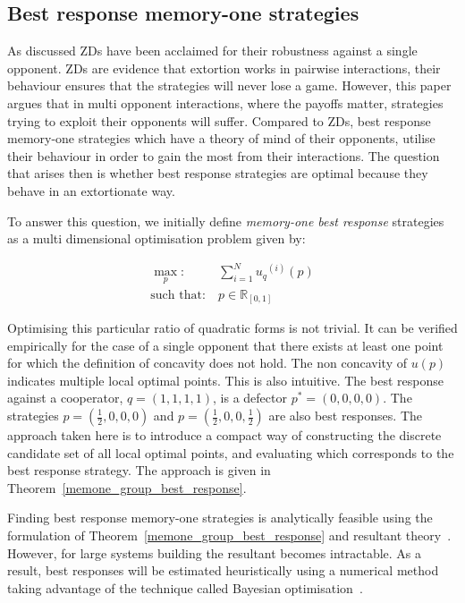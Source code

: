 \documentclass[9pt,twocolumn,twoside,lineno]{pnas-new}
\newcommand{\R}{\mathbb{R}}
\begin{document}
\subsection*{Best response memory-one strategies}

As discussed ZDs have been acclaimed for their robustness
against a single opponent. ZDs are evidence that extortion works
in pairwise interactions, their behaviour ensures that the strategies will never
lose a game. However, this paper argues that in multi opponent interactions,
where the payoffs matter, strategies trying to exploit their opponents will
suffer.
Compared to ZDs, best response memory-one strategies which have a
theory of mind of their opponents, utilise their behaviour in order to gain the
most from their interactions. The question that arises then is whether best
response strategies are optimal because they behave in an extortionate way.

To answer this question, we initially define \textit{memory-one best response}
strategies as a multi dimensional optimisation problem given by:

\begin{equation}\label{eq:mo_tournament_optimisation}
    \begin{aligned}
    \max_p: & \ \sum_{i=1} ^ {N} {u_q}^{(i)} (p)
    \\
    \text{such that}: & \ p \in \R_{[0, 1]}
    \end{aligned}
\end{equation}

Optimising this particular ratio of quadratic forms is not trivial. It can be
verified empirically for the case of a single opponent that there exists at
least one point for which the definition of concavity does not hold.
The non concavity of \(u(p)\) indicates multiple local
optimal points. This is also intuitive. The best response against a cooperator,
\(q=(1, 1, 1, 1)\), is a defector \(p^*=(0, 0, 0, 0)\). The strategies
\(p=(\frac{1}{2}, 0, 0, 0)\) and \(p=(\frac{1}{2}, 0, 0, \frac{1}{2})\) are also
best responses. The approach taken here is to introduce a compact way of
constructing the discrete candidate set of all local optimal points, and evaluating which
corresponds to the best response strategy. The approach is given in Theorem~\ref{memone_group_best_response}.

Finding best response memory-one strategies is analytically feasible using the
formulation of Theorem~\ref{memone_group_best_response} and resultant
theory~\cite{Jonsson2005}. However, for large systems building the resultant
becomes intractable. As a result, best responses will be estimated
heuristically using a numerical method taking advantage of the technique called
Bayesian optimisation~\cite{Mokus1978}.
\end{document}
